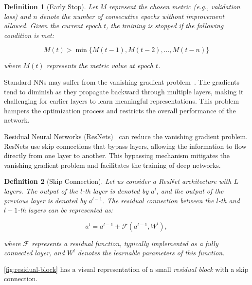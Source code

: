 \documentclass[ppgc,diss,english]{iiufrgs}
\newtheorem{definition}{Definition}
\begin{document}
\begin{definition}[Early Stop]
Let $M$ represent the chosen metric (e.g., validation loss) and $n$ denote the number of consecutive epochs without improvement allowed. Given the current epoch $t$, the training is stopped if the following condition is met:

$$M(t) > \min\{M(t-1), M(t-2), \ldots, M(t-n)\}$$

where $M(t)$ represents the metric value at epoch $t$.
\end{definition}

Standard NNs may suffer from the vanishing gradient problem~\cite{Hochreiter/1991}. The gradients tend to diminish as they propagate backward through multiple layers, making it challenging for earlier layers to learn meaningful representations. This problem hampers the optimization process and restricts the overall performance of the network.

Residual Neural Networks (ResNets)~\cite{He.etal/2016} can reduce the vanishing gradient problem. ResNets use skip connections that bypass layers, allowing the information to flow directly from one layer to another. This bypassing mechanism mitigates the vanishing gradient problem and facilitates the training of deep networks.

\begin{definition}[Skip Connection]
Let us consider a ResNet architecture with $L$ layers. The output of the $l$-th layer is denoted by $a^{l}$, and the output of the previous layer is denoted by $a^{l-1}$. The residual connection between the $l$-th and $l-1$-th layers can be represented as:

$$a^{l} = a^{l-1} + \mathcal{F}(a^{l-1}, W^{l}),$$

where $\mathcal{F}$ represents a residual function, typically implemented as a fully connected layer, and $W^{l}$ denotes the learnable parameters of this function.
\end{definition}

\cref{fig:residual-block} has a visual representation of a small \emph{residual block} with a skip connection.
\end{document}
